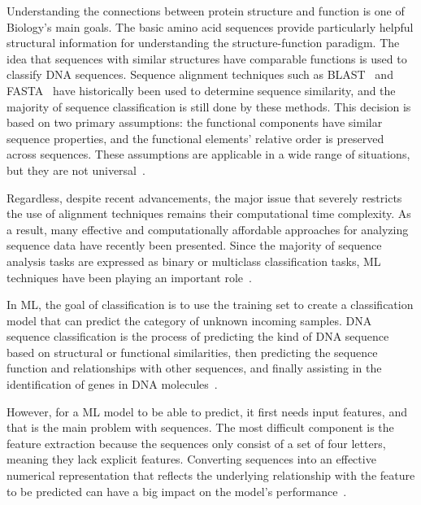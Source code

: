 Understanding the connections between protein structure and function is one of Biology's main goals. The basic amino acid sequences provide particularly helpful structural information for understanding the structure-function paradigm. The idea that sequences with similar structures have comparable functions is used to classify \gls{DNA} sequences. Sequence alignment techniques such as BLAST~\cite{Altschul1990BasicTool} and FASTA~\cite{Pearson1988ImprovedComparison} have historically been used to determine sequence similarity, and the majority of sequence classification is still done by these methods. This decision is based on two primary assumptions: the functional components have similar sequence properties, and the functional elements' relative order is preserved across sequences. These assumptions are applicable in a wide range of situations, but they are not universal~\cite{LoBosco2017DeepClassification}.

Regardless, despite recent advancements, the major issue that severely restricts the use of alignment techniques remains their computational time complexity. As a result, many effective and computationally affordable approaches for analyzing sequence data have recently been presented. Since the majority of sequence analysis tasks are expressed as binary or multiclass classification tasks, \gls{ML} techniques have been playing an important role~\cite{Liu2017BioSeq-Analysis:Approaches}.

In \gls{ML}, the goal of classification is to use the training set to create a classification model that can predict the category of unknown incoming samples. \gls{DNA} sequence classification is the process of predicting the kind of \gls{DNA} sequence based on structural or functional similarities, then predicting the sequence function and relationships with other sequences, and finally assisting in the identification of genes in \gls{DNA} molecules~\cite{Yang2020ReviewDNA}.

However, for a \gls{ML} model to be able to predict, it first needs input features, and that is the main problem with sequences. The most difficult component is the feature extraction because the sequences only consist of a set of four letters, meaning they lack explicit features. Converting sequences into an effective numerical representation that reflects the underlying relationship with the feature to be predicted can have a big impact on the model's performance~\cite{LoBosco2017DeepClassification,Chen2019ILearn:Data}.


